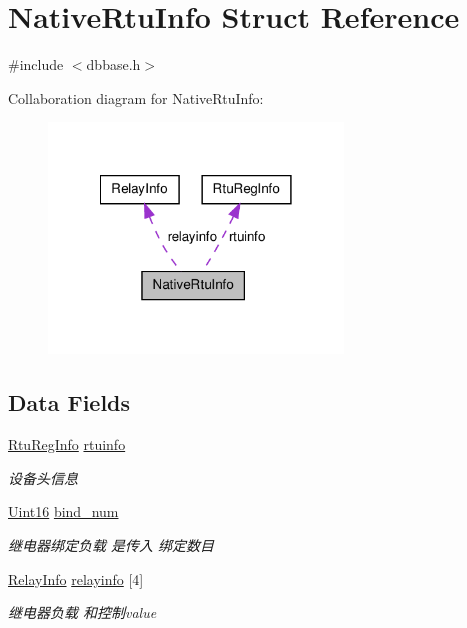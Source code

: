 \hypertarget{structNativeRtuInfo}{\section{Native\-Rtu\-Info Struct Reference}
\label{structNativeRtuInfo}
}


{\ttfamily \#include $<$dbbase.\-h$>$}



Collaboration diagram for Native\-Rtu\-Info\-:\nopagebreak
\begin{figure}[H]
\begin{center}
\leavevmode
\includegraphics[width=222pt]{structNativeRtuInfo__coll__graph}
\end{center}
\end{figure}
\subsection*{Data Fields}
\begin{DoxyCompactItemize}
\item 
\hyperlink{structRtuRegInfo}{Rtu\-Reg\-Info} \hyperlink{structNativeRtuInfo_aadeca7477bda9a54e67e8b6409998197}{rtuinfo}
\begin{DoxyCompactList}\small\item\em 设备头信息 \end{DoxyCompactList}\item 
\hyperlink{base_8h_ae9f2e1f80fbd243687a04febbf590e13}{Uint16} \hyperlink{structNativeRtuInfo_ae673b07d8c87e05626830f4e1b813f99}{bind\-\_\-num}
\begin{DoxyCompactList}\small\item\em 继电器绑定负载 是传入 绑定数目 \end{DoxyCompactList}\item 
\hyperlink{structRelayInfo}{Relay\-Info} \hyperlink{structNativeRtuInfo_ad9f9b53a53485f4e89e85dbc510348b6}{relayinfo} \mbox{[}4\mbox{]}
\begin{DoxyCompactList}\small\item\em 继电器负载 和控制value \end{DoxyCompactList}\end{DoxyCompactItemize}


